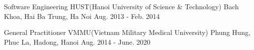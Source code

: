 

\begin{cventries}

    \cventry
    {Software Engineering} %
    {HUST(Hanoi University of Science \& Technology)} %
    {Bach Khoa, Hai Ba Trung, Ha Noi} %
    {Aug. 2013 - Feb. 2014} %
    {}

    \cventry
    {General Practitioner} %
    {VMMU(Vietnam Military Medical University)} %
    {Phung Hung, Phuc La, Hadong, Hanoi} %
    {Aug. 2014 - June. 2020} %
    {}

\end{cventries}
